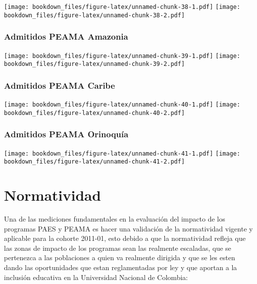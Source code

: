 \documentclass[]{article}
\theoremstyle{definition}
\theoremstyle{definition}
\theoremstyle{definition}
\theoremstyle{remark}
\begin{document}
\texttt{[image: bookdown\_files/figure-latex/unnamed-chunk-38-1.pdf]}
\texttt{[image: bookdown\_files/figure-latex/unnamed-chunk-38-2.pdf]}

\subsubsection{Admitidos PEAMA
Amazonia}\label{admitidos-peama-amazonia-1}

\texttt{[image: bookdown\_files/figure-latex/unnamed-chunk-39-1.pdf]}
\texttt{[image: bookdown\_files/figure-latex/unnamed-chunk-39-2.pdf]}

\subsubsection{Admitidos PEAMA Caribe}\label{admitidos-peama-caribe-1}

\texttt{[image: bookdown\_files/figure-latex/unnamed-chunk-40-1.pdf]}
\texttt{[image: bookdown\_files/figure-latex/unnamed-chunk-40-2.pdf]}

\subsubsection{Admitidos PEAMA
Orinoquía}\label{admitidos-peama-orinoquia-1}

\texttt{[image: bookdown\_files/figure-latex/unnamed-chunk-41-1.pdf]}
\texttt{[image: bookdown\_files/figure-latex/unnamed-chunk-41-2.pdf]}

\section{Normatividad}\label{normatividad}

Una de las mediciones fundamentales en la evaluación del impacto de los
programas PAES y PEAMA es hacer una validación de la normatividad
vigente y aplicable para la cohorte 2011-01, esto debido a que la
normatividad refleja que las zonas de impacto de los programas sean las
realmente escaladas, que se pertenezca a las poblaciones a quien va
realmente dirigida y que se les esten dando las oportunidades que estan
reglamentadas por ley y que aportan a la inclusión educativa en la
Universidad Nacional de Colombia:
\end{document}
